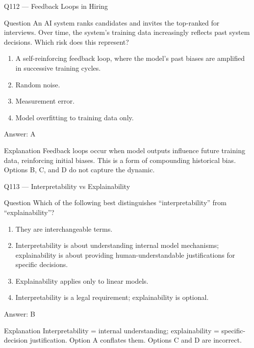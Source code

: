 \documentclass[aspectratio=169,8pt]{beamer}
\begin{document}
\begin{frame}{Q112 --- Feedback Loops in Hiring}
\begin{block}{Question}
An AI system ranks candidates and invites the top-ranked for interviews. Over time, the system's training data increasingly reflects past system decisions. Which risk does this represent?
\end{block}
\begin{enumerate}
\item A self-reinforcing feedback loop, where the model's past biases are amplified in successive training cycles.
\item Random noise.
\item Measurement error.
\item Model overfitting to training data only.
\end{enumerate}
\begin{exampleblock}{Answer: A}\end{exampleblock}
\begin{block}{Explanation}
Feedback loops occur when model outputs influence future training data, reinforcing initial biases. This is a form of compounding historical bias. Options B, C, and D do not capture the dynamic.
\end{block}
\end{frame}

\begin{frame}{Q113 --- Interpretability vs Explainability}
\begin{block}{Question}
Which of the following best distinguishes ``interpretability'' from ``explainability''?
\end{block}
\begin{enumerate}
\item They are interchangeable terms.
\item Interpretability is about understanding internal model mechanisms; explainability is about providing human-understandable justifications for specific decisions.
\item Explainability applies only to linear models.
\item Interpretability is a legal requirement; explainability is optional.
\end{enumerate}
\begin{exampleblock}{Answer: B}\end{exampleblock}
\begin{block}{Explanation}
Interpretability = internal understanding; explainability = specific-decision justification. Option A conflates them. Options C and D are incorrect.
\end{block}
\end{frame}
\end{document}
